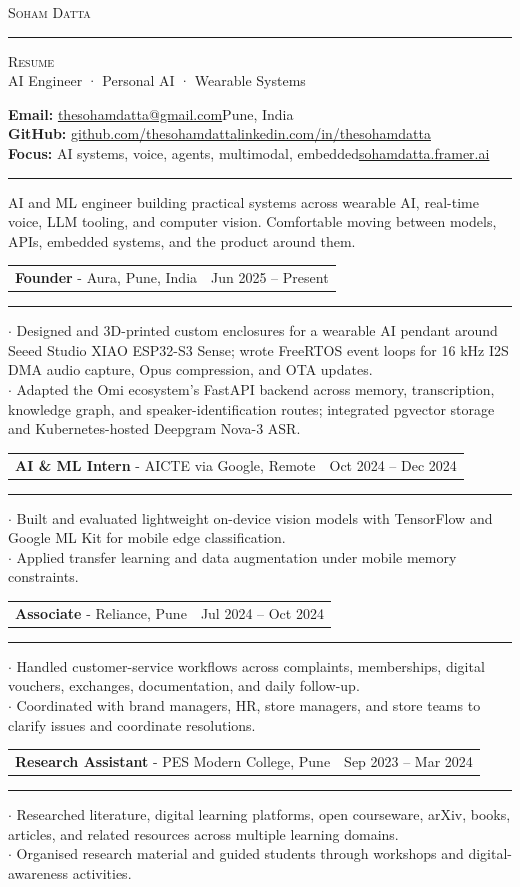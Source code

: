 \documentclass[10pt,A4]{article}
\makeatletter
\newcommand{\cvsection}[1]{%
  \vspace{1pt}{\large\textcolor{sectcol}{\textbf{#1}}}\par\vspace{0pt}}
\newcommand{\metasection}[2]{%
  \footnotesize #2\hspace*{\fill}\footnotesize #1\\[-1pt]}
\newcommand{\cvevent}[5]{%
  \begin{tabular*}{\textwidth}{@{}p{0.775\textwidth}@{\extracolsep{\fill}}r@{}}%
    \textbf{#2} - \textcolor{bgcol}{#3} & \textcolor{sectcol}{#1}\\
  \end{tabular*}%
  \vspace{-4.5pt}%
  \textcolor{softcol}{\hrule}%
  \vspace{1.5pt}%
  {\footnotesize $\cdot$ #4}\\[-1pt]
  {\footnotesize $\cdot$ #5}\\[1pt]
}
\makeatother
\begin{document}
\vspace{-6pt}
\begin{center}
  {\HUGE\textsc{Soham Datta}}\textcolor{sectcol}{\rule[-1mm]{1mm}{0.9cm}}\textsc{Resume}\\[1pt]
  {\small AI Engineer · Personal AI · Wearable Systems}
\end{center}

\vspace{1pt}
\metasection{Pune, India}{\textbf{Email:} \href{mailto:thesohamdatta@gmail.com}{thesohamdatta@gmail.com}}
\metasection{\href{https://www.linkedin.com/in/thesohamdatta/}{linkedin.com/in/thesohamdatta}}{\textbf{GitHub:} \href{https://github.com/thesohamdatta}{github.com/thesohamdatta}}
\metasection{\href{https://sohamdatta.framer.ai}{sohamdatta.framer.ai}}{\textbf{Focus:} AI systems, voice, agents, multimodal, embedded}
\vspace{1pt}\textcolor{softcol}{\hrule}

\cvsection{Summary}
{\small AI and ML engineer building practical systems across wearable AI, real-time voice, LLM tooling, and computer vision. Comfortable moving between models, APIs, embedded systems, and the product around them.}

\cvsection{Experience}

\cvevent{Jun 2025 -- Present}{Founder}{Aura, Pune, India}{Designed and 3D-printed custom enclosures for a wearable AI pendant around Seeed Studio XIAO ESP32-S3 Sense; wrote FreeRTOS event loops for 16 kHz I2S DMA audio capture, Opus compression, and OTA updates.}{Adapted the Omi ecosystem's FastAPI backend across memory, transcription, knowledge graph, and speaker-identification routes; integrated pgvector storage and Kubernetes-hosted Deepgram Nova-3 ASR.}

\cvevent{Oct 2024 -- Dec 2024}{AI \& ML Intern}{AICTE via Google, Remote}{Built and evaluated lightweight on-device vision models with TensorFlow and Google ML Kit for mobile edge classification.}{Applied transfer learning and data augmentation under mobile memory constraints.}

\cvevent{Jul 2024 -- Oct 2024}{Associate}{Reliance, Pune}{Handled customer-service workflows across complaints, memberships, digital vouchers, exchanges, documentation, and daily follow-up.}{Coordinated with brand managers, HR, store managers, and store teams to clarify issues and coordinate resolutions.}

\cvevent{Sep 2023 -- Mar 2024}{Research Assistant}{PES Modern College, Pune}{Researched literature, digital learning platforms, open courseware, arXiv, books, articles, and related resources across multiple learning domains.}{Organised research material and guided students through workshops and digital-awareness activities.}
\end{document}
